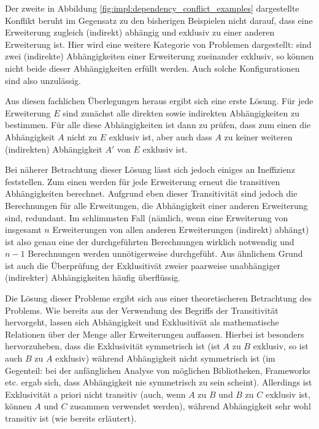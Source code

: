 Der zweite in Abbildung \ref{fig:impl:dependency_conflict_examples} dargestellte Konflikt beruht im Gegensatz zu den bisherigen Beispielen nicht darauf, dass eine Erweiterung zugleich (indirekt) abhängig und exklusiv zu einer anderen Erweiterung ist. Hier wird eine weitere Kategorie von Problemen dargestellt: sind zwei (indirekte) Abhängigkeiten einer Erweiterung zueinander exklusiv, so können nicht beide dieser Abhängigkeiten erfüllt werden. Auch solche Konfigurationen sind also unzulässig.

Aus diesen fachlichen Überlegungen heraus ergibt sich eine erste Lösung. Für jede Erweiterung $E$ sind zunächst alle direkten sowie indirekten Abhängigkeiten zu bestimmen. Für alle diese Abhängigkeiten ist dann zu prüfen, dass zum einen die Abhängigkeit $A$ nicht zu $E$ exklusiv ist, aber auch dass $A$ zu keiner weiteren (indirekten) Abhängigkeit $A'$ von $E$ exklusiv ist.

Bei näherer Betrachtung dieser Lösung lässt sich jedoch einiges an Ineffizienz feststellen. Zum einen werden für jede Erweiterung erneut die transitiven Abhängigkeiten berechnet. Aufgrund eben dieser Transitivität sind jedoch die Berechnungen für alle Erweitungen, die Abhängigkeit einer anderen Erweiterung sind, redundant. Im schlimmsten Fall (nämlich, wenn eine Erweiterung von insgesamt $n$ Erweiterungen von allen anderen Erweiterungen (indirekt) abhängt) ist also genau eine der durchgeführten Berechnungen wirklich notwendig und $n - 1$ Berechnungen werden unnötigerweise durchgefüht. Aus ähnlichem Grund ist auch die Überprüfung der Exklusitivät zweier paarweise unabhängiger (indirekter) Abhängigkeiten häufig überflüssig.

Die Lösung dieser Probleme ergibt sich aus einer theoretischeren Betrachtung des Problems. Wie bereits aus der Verwendung des Begriffs der Transitivität hervorgeht, lassen sich Abhängigkeit und Exklusitivät als mathematische Relationen über der Menge aller Erweiterungen auffassen. Hierbei ist besonders hervorzuheben, dass die Exklusivität symmetrisch ist (ist $A$ zu $B$ exklusiv, so ist auch $B$ zu $A$ exklusiv) während Abhängigkeit nicht symmetrisch ist (im Gegenteil: bei der anfänglichen Analyse von möglichen Bibliotheken, Frameworks etc. ergab sich, dass Abhängigkeit nie symmetrisch zu sein scheint). Allerdings ist Exklusivität a priori nicht transitiv (auch, wenn $A$ zu $B$ und $B$ zu $C$ exklusiv ist, können $A$ und $C$ zusammen verwendet werden), während Abhängigkeit sehr wohl transitiv ist (wie bereits erläutert).


